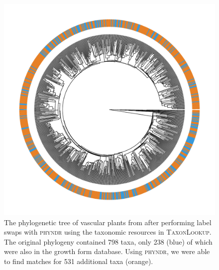 \documentclass[a4paper,11pt]{article}
\begin{document}
\begin{figure}[p]
\includegraphics[scale=0.75]{figs/tree-fig-temp}
\caption{The phylogenetic tree of vascular plants from \citet{Magallon2015} after performing label swaps with \textsc{phyndr} using the taxonomic resources in \textsc{TaxonLookup}. The original phylogeny contained 798 taxa, only 238 (blue) of which were also in the growth form database. Using \textsc{phyndr}, we were able to find matches for 531 additional taxa (orange).}
\label{fig:plant-tree}
\end{figure}
\end{document}

